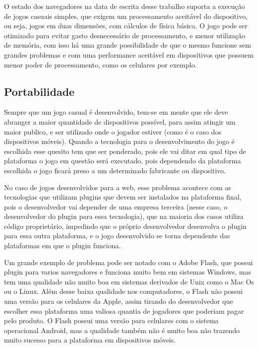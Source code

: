 O estado dos navegadores na data de escrita desse
trabalho suporta a execução de jogos casuais simples, que exigem
um processamento aceitável do dispositivo, ou seja, jogos em duas
dimensões, com cálculos de física básica. O jogo pode ser otimizado
para evitar gasto desnecessário de processamento, e menor utilização
de memória, com isso há uma grande possibilidade de que o mesmo
funcione sem grandes problemas e com uma performance aceitável em dispositivos
que possuem menor poder de processamento, como os celulares por exemplo.

\subsection{Portabilidade}

Sempre que um jogo casual é desenvolvido, tem-se em mente que ele deve
abranger a maior quantidade de dispositivos possível, para assim
atingir um maior publico, e ser utilizado onde o jogador estiver (como
é o caso dos dispositivos móveis). Quando a tecnologia para o
desenvolvimento do jogo é escolhida esse quesito tem que ser
ponderado, pois ele vai ditar em qual tipo de plataforma o jogo em
questão será executado, pois dependendo da plataforma escolhida o jogo ficará preso
a um determinado fabricante ou dispositivo.

No caso de jogos desenvolvidos para a web, esse problema acontece com as
tecnologias que utilizam plugins que devem ser instalados na
plataforma final, pois o desenvolvedor vai depender de uma empresa
terceira (nesse caso, o desenvolvedor do plugin para essa tecnologia),
que na maioria dos casos utiliza código proprietário, impedindo que o
próprio desenvolvedor desenvolva o plugin para essa outra plataforma,
e o jogo desenvolvido se torna dependente das plataformas em que o plugin
funciona.

Um grande exemplo de problema pode ser notado com o Adobe Flash, que possui
plugin para varios navegadores e funciona muito bem em sistemas Windows,
mas tem uma qualidade não muito boa em sistemas derivados de Unix como
o Mac Os ou o Linux. Além desse baixa qualidade nos computadores, o
Flash não possui uma versão para os celulares da Apple, assim tirando
do desenvolvedor que escolher essa plataforma uma valiosa quantia de
jogadores que poderiam pagar pelo produto. O Flash possui uma versão
para celulares com o sistema operacional Android, mas a qualidade
também não é muito boa não trazendo muito sucesso para a plataforma em
dispositivos móveis.

